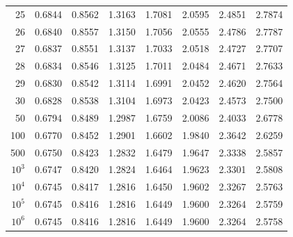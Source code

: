 \begin{center}
\begin{tabular}{|r|rrrrrrr|}
        25&0.6844&0.8562&1.3163&1.7081&2.0595&2.4851&2.7874\\
        26&0.6840&0.8557&1.3150&1.7056&2.0555&2.4786&2.7787\\
        27&0.6837&0.8551&1.3137&1.7033&2.0518&2.4727&2.7707\\
        28&0.6834&0.8546&1.3125&1.7011&2.0484&2.4671&2.7633\\
        29&0.6830&0.8542&1.3114&1.6991&2.0452&2.4620&2.7564\\
        30&0.6828&0.8538&1.3104&1.6973&2.0423&2.4573&2.7500\\
        50&0.6794&0.8489&1.2987&1.6759&2.0086&2.4033&2.6778\\
        100&0.6770&0.8452&1.2901&1.6602&1.9840&2.3642&2.6259\\
        500&0.6750&0.8423&1.2832&1.6479&1.9647&2.3338&2.5857\\
        $10^3$&0.6747&0.8420&1.2824&1.6464&1.9623&2.3301&2.5808\\
        $10^4$&0.6745&0.8417&1.2816&1.6450&1.9602&2.3267&2.5763\\
        $10^5$&0.6745&0.8416&1.2816&1.6449&1.9600&2.3264&2.5759\\
        $10^6$&0.6745&0.8416&1.2816&1.6449&1.9600&2.3264&2.5758\\
        \hline
        \end{tabular}
\end{center}
    
    